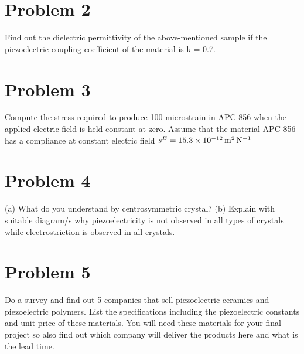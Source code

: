 \documentclass[../main.tex]{subfiles}
\begin{document}
\section{Problem 2}

Find out the dielectric permittivity of the above-mentioned sample if the piezoelectric coupling coefficient of the material is k = \num{0.7}.

\section{Problem 3}

Compute the stress required to produce 100 microstrain in APC 856 when the applied electric field is held constant at zero. 
Assume that the material APC 856 has a compliance at constant electric field $s^E=\SI{15.3d-12}{\meter\squared\per\newton}$

\section{Problem 4}

(a) What do you understand by centrosymmetric crystal? 
(b) Explain with suitable diagram/s why piezoelectricity is not observed in all types of crystals while electrostriction is observed in all crystals.

\section{Problem 5}

Do a survey and find out 5 companies that sell piezoelectric ceramics and piezoelectric polymers. List the specifications including the piezoelectric constants and unit price of these materials. You will need these materials for your final project so also find out which company will deliver the products here and what is the lead time.
\end{document}
